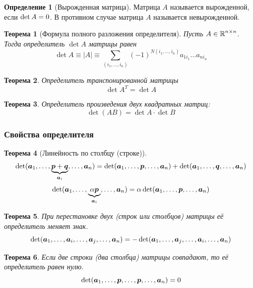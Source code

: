 \documentclass[a4paper,12pt]{article}
\newtheorem{theorem}{Теорема}[section]
\theoremstyle{definition}
\newtheorem{definition}{Определение}[section]
\theoremstyle{remark}
\theoremstyle{remark}
\begin{document}
  \begin{definition}[Вырожденная матрица]
    Матрица $A$ называется вырожденной, если $\det A \hm= 0$.
    В противном случае матрица $A$ называется невырожденной.
  \end{definition}
  
  \begin{theorem}[Формула полного разложения определителя]\label{theor:complete-expansion}
    Пусть $A \in \operatorname{\mathbb R}^{n \times n}$.
    Тогда определитель $\det A$ матрицы равен
    \[
      \det A \equiv |A| \equiv \sum_{(i_1, \ldots, i_n)} (-1)^{N(i_1, \ldots, i_n)} a_{1 i_1} \ldots a_{n i_n}
    \]
  \end{theorem}
  
  \begin{theorem}
    Определитель транспонированной матрицы
    \[
      \det A^T = \det A
    \]
  \end{theorem}
  
  \begin{theorem}
    Определитель произведения двух квадратных матриц:
    \[
      \det (AB) = \det A \cdot \det B
    \]
  \end{theorem}
  
  
  \subsubsection{Свойства определителя}
  
  \begin{theorem}[Линейность по столбцу (строке)]
    \[
      \det (\boldsymbol a_1, \ldots, \underbrace{\boldsymbol p + \boldsymbol q}_{\boldsymbol a_i}, \ldots, \boldsymbol a_n)
      = \det (\boldsymbol a_1, \ldots, \boldsymbol p, \ldots, \boldsymbol a_n)
      + \det (\boldsymbol a_1, \ldots, \boldsymbol q, \ldots, \boldsymbol a_n)
    \]
    \[
      \det (\boldsymbol a_1, \ldots, \underbrace{\alpha \boldsymbol p}_{\boldsymbol a_i}, \ldots, \boldsymbol a_n)
      = \alpha \det (\boldsymbol a_1, \ldots, \boldsymbol p, \ldots, \boldsymbol a_n)
    \]
  \end{theorem}
  
  \begin{theorem}
    При перестановке двух (строк или столбцов) матрицы её определитель меняет знак.
    \[
      \det (\boldsymbol a_1, \ldots, \boldsymbol a_i, \ldots, \boldsymbol a_j, \ldots, \boldsymbol a_n)
      = -\det (\boldsymbol a_1, \ldots, \boldsymbol a_j, \ldots, \boldsymbol a_i, \ldots, \boldsymbol a_n)
    \]
  \end{theorem}
  
  \begin{theorem}
    Если две строки (два столбца) матрицы совпадают, то её определитель равен нулю.
    \[
      \det (\boldsymbol a_1, \ldots, \boldsymbol p, \ldots, \boldsymbol p, \ldots, \boldsymbol a_n) = 0
    \]
  \end{theorem}
  
\end{document}
